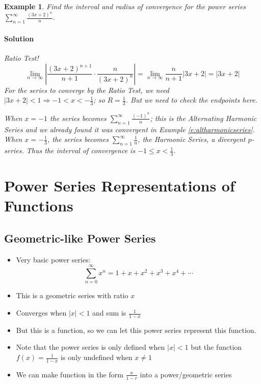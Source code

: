 \documentclass[letterpaper, 11pt, openany]{book}
\theoremstyle{mytheoremstyle}
\theoremstyle{myexamplestyle}
\newtheorem{example}{Example}[section]
\newenvironment{solution}{\paragraph{\sffamily \smaller \fontseries{b}\selectfont Solution}}{\hfill\faSquare}
\begin{document}
\begin{example}\label{e:powseriesinterval}
    Find the interval and radius of convergence for the power series $\displaystyle \sum_{n=1}^{\infty} \frac{(3x+2)^{n}}{n}$.
    \begin{solution}
        Ratio Test!
        \[\lim_{n \to \infty} \left| \frac{(3x+2)^{n+1}}{n+1} \cdot \frac{n}{(3x+2)^{n}} \right| = \lim_{n \to \infty} \frac{n}{n+1} |3x + 2| = |3x + 2|\]
        For the series to converge by the Ratio Test, we need $|3x + 2| < 1 \Rightarrow -1 < x < -\frac{1}{3}$; so $R = \frac{1}{3}$. But we need to check the endpoints here.

        When $x=-1$ the series becomes $\displaystyle \sum_{n=1}^{\infty} \frac{(-1)^{n}}{n}$; this is the Alternating Harmonic Series and we already found it was convergent in Example \ref{e:altharmonicseries}. When $x = -\frac{1}{3}$, the series becomes $\displaystyle \sum_{n=1}^{\infty} \frac{1}{n}$, the Harmonic Series, a divergent $p$-series. Thus the interval of convergence is \(-1 \leq x < \frac{1}{3}\).
    \end{solution}
\end{example}

\section{Power Series Representations of Functions}
\setcounter{figure}{0}
\subsection{Geometric-like Power Series}
\begin{itemize}
    \item Very basic power series:
    \[\sum_{n=0}^{\infty} x^{n} = 1 + x + x^{2} + x^{3} + x^{4} + \cdots   \]
    \item This is a geometric series with ratio $x$
    \item Converges when $|x| < 1$ and sum is $\frac{1}{1-x}$
    \item But this is a function, so we can let this power series represent this function.
    \item Note that the power series is only defined when $|x| < 1$ but the function $f(x) = \frac{1}{1-x}$ is only undefined when $x \neq 1$
    \item We can make function in the form $\frac{a}{1-r}$ into a power/geometric series
\end{itemize}
\end{document}
